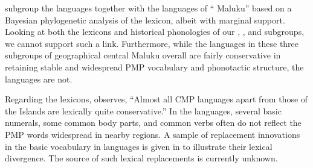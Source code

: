 \citet{GrayGreenhill2009} subgroup the  languages together with the languages
of “ Maluku” based on a Bayesian phylogenetic analysis
of the lexicon, albeit with marginal support.
Looking at both the lexicons
and historical phonologies of our ,
, and  subgroups,
we cannot support such a link.
Furthermore, while the languages in these three subgroups of
geographical central Maluku overall are fairly conservative in
retaining stable and widespread PMP vocabulary
and phonotactic structure, the  languages are not.

Regarding the lexicons, \citet[245]{Blust1993} observes,
“Almost all CMP languages apart from those of the  Islands
are lexically quite conservative.” In the  languages,
several basic numerals, some common body parts,
and common verbs often do not reflect the PMP words widespread in nearby regions.
A sample of replacement innovations in the basic vocabulary in
 languages is given in  to illustrate their lexical divergence.
The source of such lexical replacements is currently unknown.

